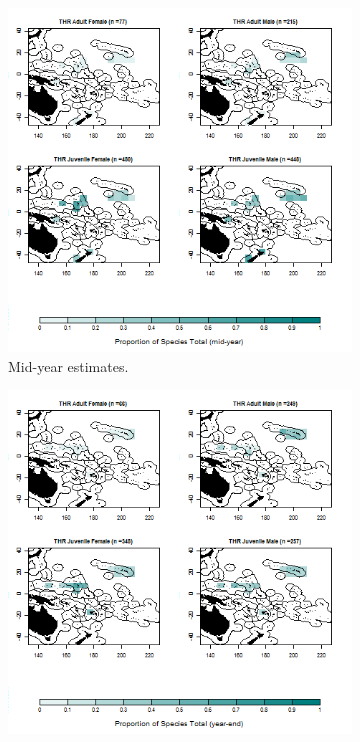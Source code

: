 \documentclass[12pt]{SCreport}
\begin{document}
\begin{landscape}
\begin{figure}
\centering
   \begin{subfigure}[b]{0.6\textwidth}
       \includegraphics[width=\textwidth]{../GRAPHICS/Defined/BI_32_Map_maturity_sex_THR_MY}
       \caption{Mid-year estimates.}
       \label{fig:test1}
   \end{subfigure}
   \begin{subfigure}[b]{0.6\textwidth}
       \includegraphics[width=\textwidth]{../GRAPHICS/Defined/BI_31_Map_maturity_sex_THR}

\end{subfigure}
\end{figure}
\end{landscape}
\end{document}
